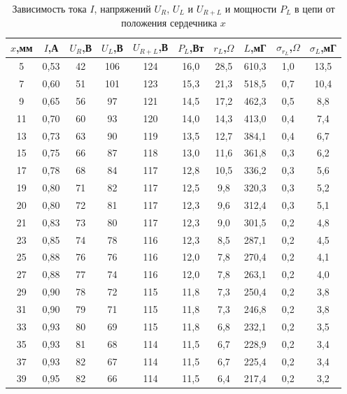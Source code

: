 \documentclass[a4paper,10pt]{article}
\begin{document}
\begin{table}[h]
	\centering
	\caption{Зависимость тока $I$, напряжений $U_R$, $U_L$ и $U_{R+L}$ и мощности $P_L$ в цепи от положения сердечника $x$} \label{Ohm}
	\begin{tabular}{|c|c|c|c|c|c|c|c|c|c|}
		\hline
		$x$,мм&$I$,А&$U_R$,В&$U_L$,В&$U_{R+L}$,В&$P_L$,Вт&$r_L$,$\Omega$&$L$,мГ&$\sigma_{r_L}$,$\Omega$&$\sigma_L$,мГ\\ \hline
		5 & 0,53 & 42 & 106 & 124 & 16,0 & 28,5 & 610,3 & 1,0 & 13,5 \\ \hline
		7 & 0,60 & 51 & 101 & 123 & 15,3 & 21,3 & 518,5 & 0,7 & 10,4 \\ \hline
		9 & 0,65 & 56 & 97 & 121 & 14,5 & 17,2 & 462,3 & 0,5 & 8,8 \\ \hline
		11 & 0,70 & 60 & 93 & 120 & 14,0 & 14,3 & 413,0 & 0,4 & 7,4 \\ \hline
		13 & 0,73 & 63 & 90 & 119 & 13,5 & 12,7 & 384,1 & 0,4 & 6,7 \\ \hline
		15 & 0,75 & 66 & 87 & 118 & 13,0 & 11,6 & 361,8 & 0,3 & 6,2 \\ \hline
		17 & 0,78 & 68 & 84 & 117 & 12,8 & 10,5 & 336,2 & 0,3 & 5,6 \\ \hline
		19 & 0,80 & 71 & 82 & 117 & 12,5 & 9,8 & 320,3 & 0,3 & 5,2 \\ \hline
		20 & 0,80 & 72 & 81 & 117 & 12,3 & 9,6 & 312,4 & 0,3 & 5,1 \\ \hline
		21 & 0,83 & 73 & 80 & 117 & 12,3 & 9,0 & 301,5 & 0,2 & 4,8 \\ \hline
		23 & 0,85 & 74 & 78 & 116 & 12,3 & 8,5 & 287,1 & 0,2 & 4,5 \\ \hline
		25 & 0,88 & 76 & 76 & 116 & 12,0 & 7,8 & 270,4 & 0,2 & 4,1 \\ \hline
		27 & 0,88 & 77 & 74 & 116 & 12,0 & 7,8 & 263,1 & 0,2 & 4,0 \\ \hline
		29 & 0,90 & 78 & 72 & 115 & 11,8 & 7,3 & 250,4 & 0,2 & 3,8 \\ \hline
		31 & 0,90 & 79 & 71 & 115 & 11,8 & 7,3 & 246,8 & 0,2 & 3,8 \\ \hline
		33 & 0,93 & 80 & 69 & 115 & 11,8 & 6,8 & 232,1 & 0,2 & 3,5 \\ \hline
		35 & 0,93 & 81 & 68 & 114 & 11,5 & 6,7 & 228,9 & 0,2 & 3,4 \\ \hline
		37 & 0,93 & 82 & 67 & 114 & 11,5 & 6,7 & 225,4 & 0,2 & 3,4 \\ \hline
		39 & 0,95 & 82 & 66 & 114 & 11,5 & 6,4 & 217,4 & 0,2 & 3,2 \\ \hline
	\end{tabular}
\end{table}
\end{document}
